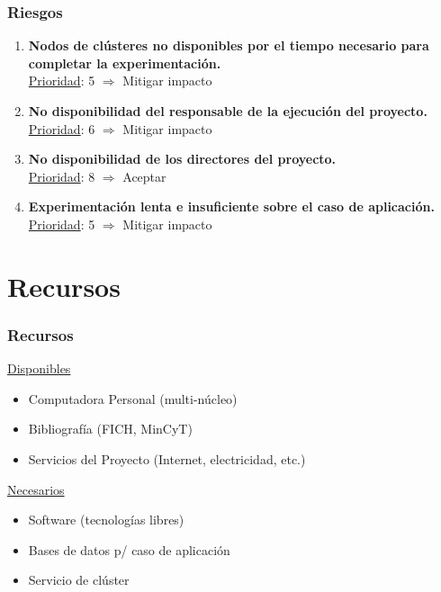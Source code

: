 \begin{frame}[t,fragile]
	\frametitle {Riesgos}
	\begin{enumerate}[R001]
		\addtocounter{enumi}{4}
		\item \textbf{Nodos de cl\'usteres no disponibles por el tiempo necesario para completar la experimentaci\'on.}\\
		\underline{Prioridad}: 5 $\Rightarrow$ \colorbox{yellow!50!orange}{Mitigar impacto}
		\pause
		\item \textbf{No disponibilidad del responsable de la ejecuci\'on del proyecto.}\\
		\underline{Prioridad}: 6 $\Rightarrow$ \colorbox{yellow!50!orange}{Mitigar impacto}
		\pause
		\item \textbf{No disponibilidad de los directores del proyecto.}\\
		\underline{Prioridad}: 8 $\Rightarrow$ \colorbox{yellow!100}{Aceptar}
		\pause
		\item \textbf{Experimentaci\'on lenta e insuficiente sobre el caso de aplicaci\'on.}\\
		\underline{Prioridad}: 5 $\Rightarrow$ \colorbox{yellow!50!orange}{Mitigar impacto}			
	\end{enumerate}
\end{frame}
\section{Recursos}
\begin{frame}[t,fragile]
	\frametitle {Recursos}
	\begin{block}{}
		\underline{Disponibles}
		\begin{itemize}
			\item Computadora Personal (multi-n\'ucleo)
			\item Bibliograf\'ia (FICH, MinCyT)
			\item Servicios del Proyecto (Internet, electricidad, etc.)
			\pause
		\end{itemize}
		\underline{Necesarios}
		\begin{itemize}
			\item Software (tecnolog\'ias libres)
			\item Bases de datos p/ caso de aplicaci\'on
			\item Servicio de cl\'uster
		\end{itemize}
	\end{block}
\end{frame}

